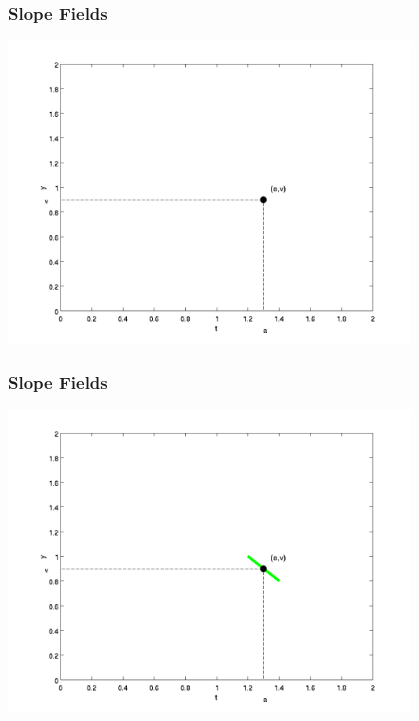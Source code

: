 \begin{frame}
  \frametitle{Slope Fields}

  \includegraphics[height=8cm]{img/singlePointInSlopeField}

\end{frame}


\begin{frame}
  \frametitle{Slope Fields}

  \includegraphics[height=8cm]{img/singlePointWithSlopeField}

\end{frame}


